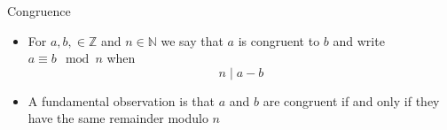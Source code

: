 \documentclass{standalone}
\begin{document}
\begin{defn*}{Congruence}
  \begin{itemize}
    \item For $a, b, \in \mathbb{Z}$ and $n \in \mathbb{N}$ we say that $a$ is congruent to $b$ and write $a  \equiv b \mod n$ when 
      \[
      n \mid a - b
      \]
    \item A fundamental observation is that $a$ and $b$ are congruent if and only if they have the same remainder modulo $n$
  \end{itemize}

\end{defn*}
\end{document}
